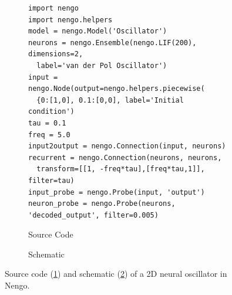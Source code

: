 \documentclass[english]{article}
\begin{document}
\begin{figure}
\centering

\begin{subfigure}[a]{\textwidth}
\centering
\lstset{language=Python}
\begin{lstlisting}[frame=single]
import nengo
import nengo.helpers
model = nengo.Model('Oscillator')
neurons = nengo.Ensemble(nengo.LIF(200), dimensions=2, 
  label='van der Pol Oscillator')
input = nengo.Node(output=nengo.helpers.piecewise(
  {0:[1,0], 0.1:[0,0], label='Initial condition')
tau = 0.1
freq = 5.0
input2output = nengo.Connection(input, neurons)
recurrent = nengo.Connection(neurons, neurons, 
  transform=[[1, -freq*tau],[freq*tau,1]], filter=tau)
input_probe = nengo.Probe(input, 'output')
neuron_probe = nengo.Probe(neurons, 'decoded_output', filter=0.005)
\end{lstlisting}
\caption{Source Code}
\label{lst:oscillator2d:code}
\end{subfigure}

\begin{subfigure}[b]{0.3\textwidth}
\centering
\caption{Schematic}
\label{lst:oscillator2d:schematic}
\end{subfigure}

\caption[A 2D neural oscillator in Nengo.]
{Source code (\ref{lst:oscillator2d:code}) and schematic (\ref{lst:oscillator2d:schematic})
of a 2D neural oscillator in Nengo.}
\label{lst:oscillator2d}
\end{figure}
\end{document}
